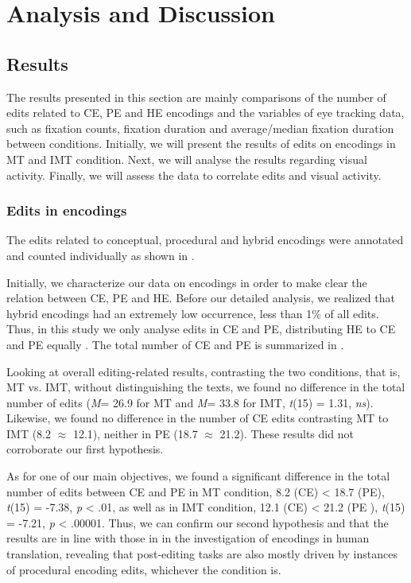 \documentclass[output=paper]{langsci/langscibook}
\begin{document}
\section{Analysis and Discussion}

\subsection{Results }

The results presented in this section are mainly comparisons of the number of edits related to CE, PE and HE encodings and the variables of eye tracking data, such as fixation counts, fixation duration and average/median fixation duration between conditions. Initially, we will present the results of edits on encodings in MT and IMT condition. Next, we will analyse the results regarding visual activity. Finally, we will assess the data to correlate edits and visual activity. 

\subsubsection{Edits in encodings}

The edits related to conceptual, procedural and hybrid encodings were annotated and counted individually as shown in .


Initially, we characterize our data on encodings in order to make clear the relation between CE, PE and HE.  Before our detailed analysis, we realized that hybrid encodings had an extremely low occurrence, less than 1\% of all edits. Thus, in this study we only analyse edits in CE and PE, distributing HE to CE and PE equally \citep[cf. ][]{alves2013}. The total number of CE and PE is summarized in .



Looking at overall editing-related results, contrasting the two conditions, that is,  MT vs. IMT, without distinguishing the texts, we found no difference in the total number of edits (\textit{M}= 26.9 for MT and \textit{M}= 33.8 for IMT, \textit{t}(15) = 1.31, \textit{ns}). Likewise, we found no difference in the number of CE edits contrasting MT to IMT (8.2 ${\approx}$ 12.1), neither in PE (18.7 ${\approx}$ 21.2). These results did not corroborate our first hypothesis. 



As for one of our main objectives, we found a significant difference in the total number of edits between CE and PE in MT condition, 8.2 (CE) {\textless} 18.7 (PE),               \textit{t}(15) = -7.38, \textit{p} {\textless} .01, as well as in IMT condition, 12.1 (CE) {\textless} 21.2 (PE ), \textit{t}(15) = -7.21,     \textit{p} {\textless} .00001. Thus, we can confirm our second hypothesis and that the results are in line with those in \citet{alves2013} in the investigation of encodings in human translation, revealing that post-editing tasks are also mostly driven by instances of procedural encoding edits, whichever the condition is.
\end{document}

